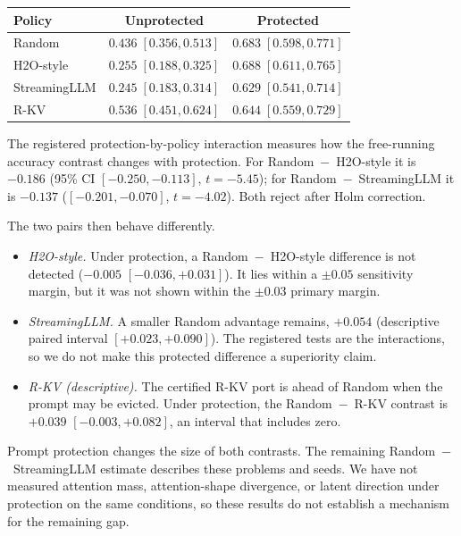 \documentclass{article}
\begin{document}
\begin{center}
\small
\begin{tabular}{lcc}
\toprule
Policy & Unprotected & Protected \\
\midrule
Random & $0.436\;[0.356, 0.513]$ & $0.683\;[0.598, 0.771]$ \\
H2O-style & $0.255\;[0.188, 0.325]$ & $0.688\;[0.611, 0.765]$ \\
StreamingLLM & $0.245\;[0.183, 0.314]$ & $0.629\;[0.541, 0.714]$ \\
R-KV & $0.536\;[0.451, 0.624]$ & $0.644\;[0.559, 0.729]$ \\
\bottomrule
\end{tabular}
\end{center}

The registered protection-by-policy interaction measures how the free-running accuracy contrast changes with protection. For Random~$-$~H2O-style it is $-0.186$ (95\% CI $[-0.250,-0.113]$, $t=-5.45$); for Random~$-$~StreamingLLM it is $-0.137$ ($[-0.201,-0.070]$, $t=-4.02$). Both reject after Holm correction.

The two pairs then behave differently.
\begin{itemize}
\item \emph{H2O-style.} Under protection, a Random~$-$~H2O-style difference is not detected ($-0.005$ $[-0.036, +0.031]$). It lies within a $\pm 0.05$ sensitivity margin, but it was not shown within the $\pm 0.03$ primary margin.
\item \emph{StreamingLLM.} A smaller Random advantage remains, $+0.054$ (descriptive paired interval $[+0.023, +0.090]$). The registered tests are the interactions, so we do not make this protected difference a superiority claim.
\item \emph{R-KV (descriptive).} The certified R-KV port is ahead of Random when the prompt may be evicted. Under protection, the Random~$-$~R-KV contrast is $+0.039$ $[-0.003, +0.082]$, an interval that includes zero.
\end{itemize}

Prompt protection changes the size of both contrasts. The remaining Random~$-$~StreamingLLM estimate describes these problems and seeds. We have not measured attention mass, attention-shape divergence, or latent direction under protection on the same conditions, so these results do not establish a mechanism for the remaining gap.
\end{document}

